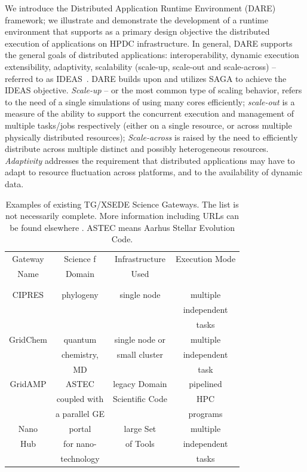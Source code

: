 \documentclass[]{svjour3}
\begin{document}
We introduce the Distributed Application Runtime Environment (DARE)
framework; we illustrate and demonstrate the development of a runtime
environment that supports as a primary design objective the
distributed execution of applications on HPDC infrastructure.  In
general, DARE supports the general goals of distributed applications:
interoperability, dynamic execution %
extensibility, adaptivity, scalability (scale-up, scale-out and
scale-across) -- referred to as IDEAS~\cite{ideas}.  DARE builds upon
and utilizes SAGA to achieve the IDEAS objective.  {\it Scale-up} --
or the most common type of scaling behavior, refers to the need of a
single simulations of using many cores efficiently; {\it scale-out} is
a measure of the ability to support the concurrent execution and
management of multiple tasks/jobs respectively (either on a single
resource, or across multiple physically distributed resources); {\it
  Scale-across} is raised by the need to efficiently distribute across
multiple distinct and possibly heterogeneous resources. {\it
  Adaptivity} addresses the requirement that distributed applications
may have to adapt to resource fluctuation across platforms, and to the
availability of dynamic data.

\begin{table}
\centering
 \small
\begin{tabular}{|c|c|c|c|} 
  \hline Gateway  & Science f & Infrastructure & Execution Mode 
  \\
  Name & Domain & Used & \\ 
  &  &  & \\
  & & & \\  \hline \hline 
  
  CIPRES   & phylogeny  &  single node  & multiple  \\
   &  &   & independent   \\ 
  &  &  &  tasks \\  \hline
  GridChem   & quantum & single node or     & multiple  \\
     & chemistry, & small cluster & independent   \\
  & MD &  & task  \\ \hline
   GridAMP     & ASTEC  & legacy Domain  & pipelined \\ 
  & coupled with  &  Scientific Code   & HPC  \\
  & a parallel GE &   &  programs \\ \hline
  Nano  & portal  & large Set   & multiple \\
  Hub  & for nano- & of Tools  & independent \\
   & technology &  & tasks \\ \hline
  \hline
\end{tabular} \caption{Examples of existing TG/XSEDE Science Gateways. The list is not necessarily complete. More information including URLs can be found elsewhere \cite{tg-sg-list-url}. ASTEC means Aarhus Stellar Evolution Code.}
 \label{table:TG-sg} 
\end{table}
\end{document}
